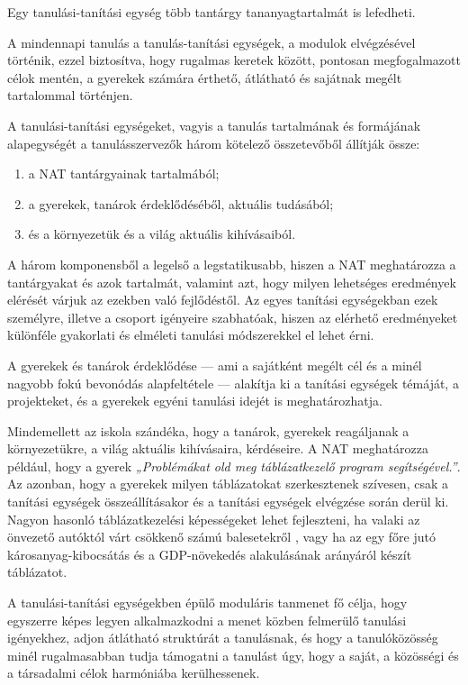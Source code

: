 Egy tanulási-tanítási egység több tantárgy tananyagtartalmát is
lefedheti.

A mindennapi tanulás a tanulás-tanítási egységek, a modulok elvégzésével
történik, ezzel biztosítva, hogy rugalmas keretek között, pontosan
megfogalmazott célok mentén, a gyerekek számára érthető, átlátható és
sajátnak megélt tartalommal történjen.

A tanulási-tanítási egységeket, vagyis a tanulás tartalmának és
formájának alapegységét a tanulásszervezők három kötelező összetevőből
állítják össze:

\begin{enumerate}
\def\labelenumi{\arabic{enumi}.}
\item
  a NAT tantárgyainak tartalmából;
\item
  a gyerekek, tanárok érdeklődéséből, aktuális tudásából;
\item
  és a környezetük és a világ aktuális kihívásaiból.
\end{enumerate}

A három komponensből a legelső a legstatikusabb, hiszen a NAT
meghatározza a tantárgyakat és azok tartalmát, valamint azt, hogy milyen
lehetséges eredmények elérését várjuk az ezekben való fejlődéstől. Az
egyes tanítási egységekban ezek személyre, illetve a csoport igényeire
szabhatóak, hiszen az elérhető eredményeket különféle gyakorlati és
elméleti tanulási módszerekkel el lehet érni.

A gyerekek és tanárok érdeklődése --- ami a sajátként megélt cél és a
minél nagyobb fokú bevonódás alapfeltétele --- alakítja ki a tanítási
egységek témáját, a projekteket, és a gyerekek egyéni tanulási idejét is
meghatározhatja.

Mindemellett az iskola szándéka, hogy a tanárok, gyerekek reagáljanak a
környezetükre, a világ aktuális kihívásaira, kérdéseire. A NAT
meghatározza például, hogy a gyerek \emph{„Problémákat old meg
táblázatkezelő\break
program segítségével.''}. Az azonban, hogy a gyerekek
milyen táblázatokat szerkesztenek szívesen, csak a tanítási egységek
összeállításakor és a tanítási egységek elvégzése során derül ki. Nagyon
hasonló táblázatkezelési képességeket lehet fejleszteni, ha valaki az
önvezető autóktól várt csökkenő számú balesetekről , vagy ha az egy főre
jutó károsanyag-kibocsátás és a GDP-növekedés alakulásának arányáról
készít táblázatot.

A tanulási-tanítási egységekben épülő moduláris tanmenet fő célja, hogy
egyszerre képes legyen alkalmazkodni a menet közben felmerülő tanulási
igényekhez, adjon átlátható struktúrát a tanulásnak, és hogy a
tanulóközösség minél rugalmasabban tudja támogatni a tanulást úgy, hogy
a saját, a közösségi és a társadalmi célok harmóniába kerülhessenek.

